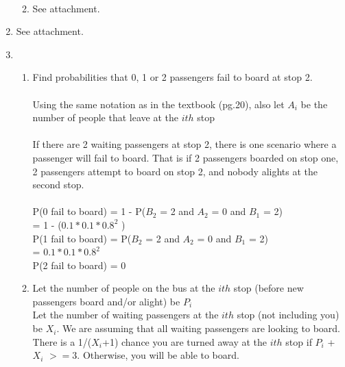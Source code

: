 \documentclass{article}
\begin{document}
\begin{enumerate}
\begin{enumerate}
            \\
            \item See attachment.
        \end{enumerate}
    \item See attachment.
    \item 
        \begin{enumerate}
            \item Find probabilities that 0, 1 or 2 passengers fail to board at stop 2. 
            \\
            \\Using the same notation as in the textbook (pg.20), also let $A_i$ be the number of people that leave at the $ith$ stop
            \\
            \\If there are 2 waiting passengers at stop 2, there is one scenario where a passenger will fail to board. That is if 2 passengers boarded on stop one, 2 passengers attempt to board on stop 2, and nobody alights at the second stop. 
            \\
            \\P(0 fail to board) = 1 - P($B_2$ = 2 and $A_2$ = 0 and $B_1$ = 2) 
            \\ = 1 - ($0.1 * 0.1 * 0.8^2$ )
            \\P(1 fail to board) = P($B_2$ = 2 and $A_2$ = 0 and $B_1$ = 2) 
            \\ = $0.1 * 0.1 * 0.8^2$ 
            \\P(2 fail to board) = 0 
            \item
            Let the number of people on the bus at the $ith$ stop (before new passengers board and/or alight) be $P_i$
            \\Let the number of waiting passengers at the $ith$ stop (not including you) be $X_i$.
            We are assuming that all waiting passengers are looking to board. 
            \\There is a 1/($X_i$+1) chance you are turned away at the $ith$ stop if $P_i$ + $X_i$ $>= 3$. Otherwise, you will be able to board.
            

\end{enumerate}
\end{enumerate}
\end{document}
